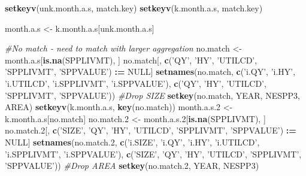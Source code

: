 \documentclass[]{article}
\newenvironment{Shaded}{\begin{snugshade}}{\end{snugshade}}
\newcommand{\KeywordTok}[1]{\textcolor[rgb]{0.13,0.29,0.53}{\textbf{#1}}}
\newcommand{\DecValTok}[1]{\textcolor[rgb]{0.00,0.00,0.81}{#1}}
\newcommand{\StringTok}[1]{\textcolor[rgb]{0.31,0.60,0.02}{#1}}
\newcommand{\CommentTok}[1]{\textcolor[rgb]{0.56,0.35,0.01}{\textit{#1}}}
\newcommand{\OtherTok}[1]{\textcolor[rgb]{0.56,0.35,0.01}{#1}}
\newcommand{\OperatorTok}[1]{\textcolor[rgb]{0.81,0.36,0.00}{\textbf{#1}}}
\newcommand{\ErrorTok}[1]{\textcolor[rgb]{0.64,0.00,0.00}{\textbf{#1}}}
\newcommand{\NormalTok}[1]{#1}
\begin{document}
\begin{Shaded}
\begin{Highlighting}[]
  \KeywordTok{setkeyv}\NormalTok{(unk.month.a.s, match.key)}
  \KeywordTok{setkeyv}\NormalTok{(k.month.a.s,   match.key)}
  
\NormalTok{  month.a.s <-}\StringTok{ }\NormalTok{k.month.a.s[unk.month.a.s]}
  
  \CommentTok{#No match - need to match with larger aggregation}
\NormalTok{  no.match  <-}\StringTok{ }\NormalTok{month.a.s[}\KeywordTok{is.na}\NormalTok{(SPPLIVMT), ]}
\NormalTok{  no.match[, }\KeywordTok{c}\NormalTok{(}\StringTok{'QY'}\NormalTok{, }\StringTok{'HY'}\NormalTok{, }\StringTok{'UTILCD'}\NormalTok{, }\StringTok{'SPPLIVMT'}\NormalTok{, }\StringTok{'SPPVALUE'}\NormalTok{) }\OperatorTok{:}\ErrorTok{=}\StringTok{ }\OtherTok{NULL}\NormalTok{]}
  \KeywordTok{setnames}\NormalTok{(no.match, }\KeywordTok{c}\NormalTok{(}\StringTok{'i.QY'}\NormalTok{, }\StringTok{'i.HY'}\NormalTok{, }\StringTok{'i.UTILCD'}\NormalTok{, }\StringTok{'i.SPPLIVMT'}\NormalTok{, }\StringTok{'i.SPPVALUE'}\NormalTok{), }
           \KeywordTok{c}\NormalTok{(}\StringTok{'QY'}\NormalTok{, }\StringTok{'HY'}\NormalTok{, }\StringTok{'UTILCD'}\NormalTok{, }\StringTok{'SPPLIVMT'}\NormalTok{, }\StringTok{'SPPVALUE'}\NormalTok{))}
  \CommentTok{#Drop SIZE}
  \KeywordTok{setkey}\NormalTok{(no.match, YEAR, NESPP3, AREA)}
  \KeywordTok{setkeyv}\NormalTok{(k.month.a.s, }\KeywordTok{key}\NormalTok{(no.match))}
\NormalTok{  month.a.s.}\DecValTok{2}\NormalTok{ <-}\StringTok{ }\NormalTok{k.month.a.s[no.match]}
\NormalTok{  no.match.}\DecValTok{2}\NormalTok{ <-}\StringTok{ }\NormalTok{month.a.s.}\DecValTok{2}\NormalTok{[}\KeywordTok{is.na}\NormalTok{(SPPLIVMT), ]}
\NormalTok{  no.match.}\DecValTok{2}\NormalTok{[, }\KeywordTok{c}\NormalTok{(}\StringTok{'SIZE'}\NormalTok{, }\StringTok{'QY'}\NormalTok{, }\StringTok{'HY'}\NormalTok{, }\StringTok{'UTILCD'}\NormalTok{, }\StringTok{'SPPLIVMT'}\NormalTok{, }\StringTok{'SPPVALUE'}\NormalTok{) }\OperatorTok{:}\ErrorTok{=}\StringTok{ }\OtherTok{NULL}\NormalTok{]}
  \KeywordTok{setnames}\NormalTok{(no.match.}\DecValTok{2}\NormalTok{, }\KeywordTok{c}\NormalTok{(}\StringTok{'i.SIZE'}\NormalTok{, }\StringTok{'i.QY'}\NormalTok{, }\StringTok{'i.HY'}\NormalTok{, }\StringTok{'i.UTILCD'}\NormalTok{, }\StringTok{'i.SPPLIVMT'}\NormalTok{, }\StringTok{'i.SPPVALUE'}\NormalTok{), }
           \KeywordTok{c}\NormalTok{(}\StringTok{'SIZE'}\NormalTok{, }\StringTok{'QY'}\NormalTok{, }\StringTok{'HY'}\NormalTok{, }\StringTok{'UTILCD'}\NormalTok{, }\StringTok{'SPPLIVMT'}\NormalTok{, }\StringTok{'SPPVALUE'}\NormalTok{))}
  \CommentTok{#Drop AREA}
  \KeywordTok{setkey}\NormalTok{(no.match.}\DecValTok{2}\NormalTok{, YEAR, NESPP3)}

\end{Highlighting}
\end{Shaded}
\end{document}
